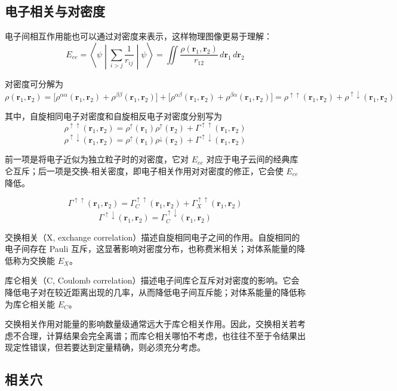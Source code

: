 \subsection*{电子相关与对密度}

电子间相互作用能也可以通过对密度来表示，这样物理图像更易于理解：
\[
E_{ee}
=
\left\langle
\psi\middle|\sum_{i>j}\frac{1}{r_{ij}}\middle|\psi
\right\rangle
=
\iint \frac{\rho(\mathbf r_1,\mathbf r_2)}{r_{12}}\,d\mathbf r_1\,d\mathbf r_2
\]

对密度可分解为
\[
\rho(\mathbf r_1,\mathbf r_2)
=
\bigl[\rho^{\alpha\alpha}(\mathbf r_1,\mathbf r_2)+\rho^{\beta\beta}(\mathbf r_1,\mathbf r_2)\bigr]
+
\bigl[\rho^{\alpha\beta}(\mathbf r_1,\mathbf r_2)+\rho^{\beta\alpha}(\mathbf r_1,\mathbf r_2)\bigr]
=
\rho^{\uparrow\uparrow}(\mathbf r_1,\mathbf r_2)+\rho^{\uparrow\downarrow}(\mathbf r_1,\mathbf r_2)
\]

其中，自旋相同电子对密度和自旋相反电子对密度分别写为
\[
\rho^{\uparrow\uparrow}(\mathbf r_1,\mathbf r_2)
=
\rho^\uparrow(\mathbf r_1)\rho^\uparrow(\mathbf r_2)
+
\Gamma^{\uparrow\uparrow}(\mathbf r_1,\mathbf r_2)
\]
\[
\rho^{\uparrow\downarrow}(\mathbf r_1,\mathbf r_2)
=
\rho^\uparrow(\mathbf r_1)\rho^\downarrow(\mathbf r_2)
+
\Gamma^{\uparrow\downarrow}(\mathbf r_1,\mathbf r_2)
\]

前一项是将电子近似为独立粒子时的对密度，它对 $E_{ee}$ 对应于电子云间的经典库仑互斥；后一项是交换-相关密度，即电子相关作用对对密度的修正，它会使 $E_{ee}$ 降低。

\[
\Gamma^{\uparrow\uparrow}(\mathbf r_1,\mathbf r_2)
=
\Gamma_C^{\uparrow\uparrow}(\mathbf r_1,\mathbf r_2)
+
\Gamma_X^{\uparrow\uparrow}(\mathbf r_1,\mathbf r_2)
\]
\[
\Gamma^{\uparrow\downarrow}(\mathbf r_1,\mathbf r_2)
=
\Gamma_C^{\uparrow\downarrow}(\mathbf r_1,\mathbf r_2)
\]

交换相关（X, exchange correlation）描述自旋相同电子之间的作用。自旋相同的电子间存在 Pauli 互斥，这显著影响对密度分布，也称费米相关；对体系能量的降低称为交换能 $E_X$。

库仑相关（C, Coulomb correlation）描述电子间库仑互斥对对密度的影响。它会降低电子对在较近距离出现的几率，从而降低电子间互斥能；对体系能量的降低称为库仑相关能 $E_C$。

交换相关作用对能量的影响数量级通常远大于库仑相关作用。因此，交换相关若考虑不合理，计算结果会完全离谱；而库仑相关哪怕不考虑，也往往不至于令结果出现定性错误，但若要达到定量精确，则必须充分考虑。

\subsection*{相关穴}

